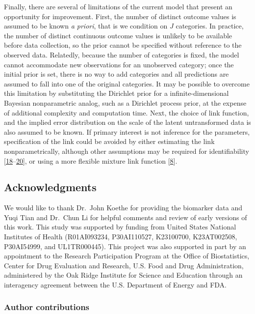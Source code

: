 \documentclass[
]{article}
\begin{document}
Finally, there are several of limitations of the current model that present an opportunity for improvement. First, the number of distinct outcome values is assumed to be known \emph{a priori}, that is we condition on \(J\) categories. In practice, the number of distinct continuous outcome values is unlikely to be available before data collection, so the prior cannot be specified without reference to the observed data. Relatedly, because the number of categories is fixed, the model cannot accommodate new observations for an unobserved category; once the initial prior is set, there is no way to add categories and all predictions are assumed to fall into one of the original categories. It may be possible to overcome this limitation by substituting the Dirichlet prior for a infinite-dimensional Bayesian nonparametric analog, such as a Dirichlet process prior, at the expense of additional complexity and computation time. Next, the choice of link function, and the implied error distribution on the scale of the latent untransformed data is also assumed to be known. If primary interest is not inference for the parameters, specification of the link could be avoided by either estimating the link nonparametrically, although other assumptions may be required for identifiability {[}\protect\hyperlink{ref-song_semiparametric_2012}{18}--\protect\hyperlink{ref-mallick_bayesian_2003}{20}{]}, or using a more flexible mixture link function {[}\protect\hyperlink{ref-lang_bayesian_1999}{8}{]}.

\newpage

\hypertarget{acknowledgments}{%
\subsection{Acknowledgments}\label{acknowledgments}}

We would like to thank Dr.~John Koethe for providing the biomarker data and Yuqi Tian and Dr.~Chun Li for helpful comments and review of early versions of this work. This study was supported by funding from United States National Institutes of Health (R01AI093234, P30AI110527, K23100700, K23AT002508, P30AI54999, and UL1TR000445). This project was also supported in part by an appointment to the Research Participation Program at the Office of Biostatistics, Center for Drug Evaluation and Research, U.S. Food and Drug Administration, administered by the Oak Ridge Institute for Science and Education through an interagency agreement between the U.S. Department of Energy and FDA.

\hypertarget{author-contributions}{%
\subsubsection{Author contributions}\label{author-contributions}}
\end{document}
